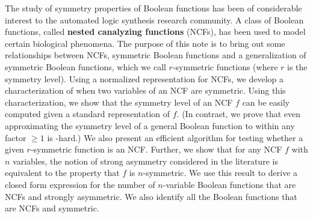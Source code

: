The study of symmetry properties of Boolean
functions has been of considerable interest to the
automated logic synthesis research community.
A class of Boolean functions, 
called \textbf{nested canalyzing functions} (NCFs),
has been used to model certain biological phenomena.
The purpose of this note is to bring out some relationships between NCFs, symmetric 
Boolean functions and a generalization of symmetric Boolean functions,
which we call $r$-symmetric functions (where $r$ is the symmetry level).
Using a normalized representation for NCFs, we develop a 
characterization of when two variables of an NCF are symmetric.
Using this characterization, we show 
that the symmetry level of an NCF $f$
can be easily computed given a standard representation of $f$.
(In contrast, we prove that even approximating the symmetry level of
a general Boolean function to within any factor $\geq 1$ is \cnp-hard.) 
We also present an efficient algorithm for testing whether 
a given $r$-symmetric function is an NCF.
Further, we show that for any NCF $f$ with $n$ variables, the notion of
strong asymmetry considered in the literature is equivalent to
the property that $f$ is $n$-symmetric. 
We use this result to derive a closed form expression for the
number of $n$-variable Boolean functions 
that are NCFs and strongly asymmetric.
We also identify all the Boolean functions that are NCFs 
and symmetric. 
